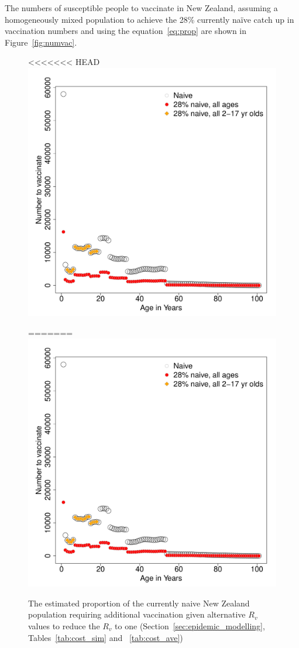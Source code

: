 \documentclass{article}
\begin{document}
\begin{itemize}
The numbers of susceptible people to vaccinate in New Zealand, assuming a homogeneously mixed population to achieve the 28\% currently na\"{i}ve catch up in vaccination numbers and using the equation~\ref{eq:prop} are shown in Figure~\ref{fig:numvac}.


\begin{figure}[width=1\textwidth]
     \centering
<<<<<<< HEAD
\includegraphics{draftfinalreport-061}
     \caption{The estimated proportion of the currently naive New Zealand population requiring additional vaccination given alternative $R_v$ values to reduce the $R_v$ to one (Section~\ref{sec:epidemic_modelling}, Tables~\ref{tab:cost_sim} and ~\ref{tab:cost_ave})}
=======
\includegraphics{draftfinalreport-060}

\end{figure}
\end{itemize}
\end{document}
